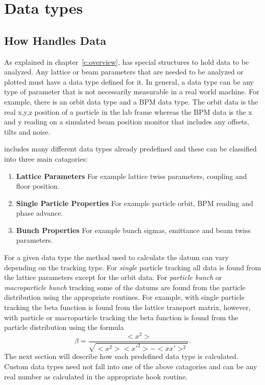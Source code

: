 \chapter{Data types}
\label{c:data_types}

\section{How \tao Handles Data}

As explained in chapter~\ref{c:overview}, \tao has special structures to hold
data to be analyzed. Any lattice or beam parameters that are needed to be
analyzed or plotted must have a data type defined for it. In general, a data
type can be any type of parameter that is not necessarily measurable in a real
world machine. For example, there is an orbit data type and a BPM data type. The
orbit data is the real x,y,z position of a particle in the lab frame whereas the BPM
data is the x and y reading on a simulated beam position monitor that includes
any offsets, tilts and noise.

\tao includes many different data types already predefined and
these can be classified into three main catagories:
\begin{enumerate}
  \item \textbf{Lattice Parameters} \Newline
    For example lattice twiss parameters, coupling and floor position.
  \item \textbf{Single Particle Properties} \Newline
    For example particle orbit, BPM reading and phase advance.
  \item \textbf{Bunch Properties} \Newline
    For example bunch sigmas, emittance and beam twiss parameters.
\end{enumerate}
For a given data type the method used to calculate the datum can vary depending
on the tracking type. For {\it single} particle tracking all data is found from
the lattice parameters except for the orbit data. For \textit{particle bunch} or
\textit{macroparticle bunch} tracking some of the datums  are found from the
particle distribution using the appropriate \bmad routines. For example, with
single particle tracking the beta function is found from the lattice transport
matrix, however, with particle or macroparticle tracking the beta function is
found from the particle distribution using the formula
\begin{equation}
  \beta = \frac{<x^{2}>}{\sqrt{<x^{2}> <x'^{2}> - <x x'>^{2}}}.
\end{equation}
The next section will describe how each predefined data type is calculated.
Custom data types need not fall into one of the above catagories and can be any
real number as calculated in the appropriate hook routine.


